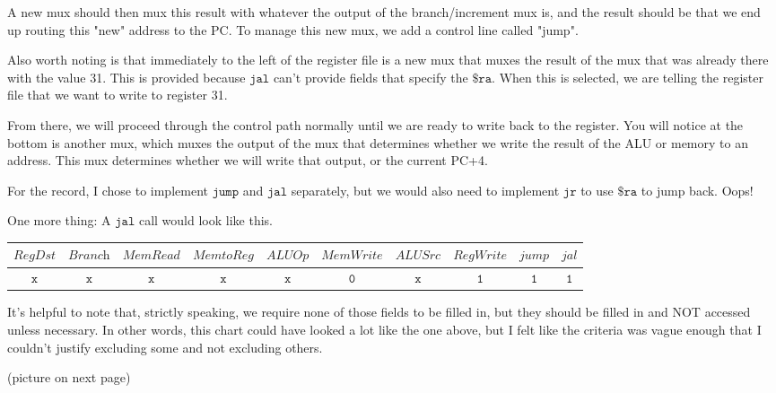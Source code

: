 \documentclass[a4paper]{article}
\begin{document}
A new mux should then mux this result with whatever the output of the branch/increment mux is, and the result should be that we end up routing this "new" address to the PC. To manage this new mux, we add a control line called "jump".

Also worth noting is that immediately to the left of the register file is a new mux that muxes the result of the mux that was already there with the value 31. This is provided because $\texttt{jal}$ can't provide fields that specify the $\texttt{\$ra}$. When this is selected, we are telling the register file that we want to write to register 31.

From there, we will proceed through the control path normally until we are ready to write back to the register. You will notice at the bottom is another mux, which muxes the output of the mux that determines whether we write the result of the ALU or memory to an address. This mux determines whether we will write that output, or the current PC+4.

For the record, I chose to implement $\texttt{jump}$ and $\texttt{jal}$ separately, but we would also need to implement $\texttt{jr}$ to use $\texttt{\$ra}$ to jump back. Oops!

One more thing: A $\texttt{jal}$ call would look like this.

\begin{center}
\begin{tabular}{|c|c|c|c|c|c|c|c|c|c|}
\hline
$\textit{RegDst}$ & $\textit{Branch}$ & $\textit{MemRead}$ & $\textit{MemtoReg}$ & $\textit{ALUOp}$ & $\textit{MemWrite}$ & $\textit{ALUSrc}$ & $\textit{RegWrite}$ & $\textit{jump}$ & $\textit{jal}$ \\
\hline
$\texttt{x}$ & $\texttt{x}$ & $\texttt{x}$ & $\texttt{x}$ & $\texttt{x}$ & $\texttt{0}$ & $\texttt{x}$ & $\texttt{1}$ & $\texttt{1}$ & $\texttt{1}$ \\
\hline
\end{tabular}
\end{center}

It's helpful to note that, strictly speaking, we require none of those fields to be filled in, but they should be filled in and NOT accessed unless necessary. In other words, this chart could have looked a lot like the one above, but I felt like the criteria was vague enough that I couldn't justify excluding some and not excluding others.

(picture on next page)
\end{document}
